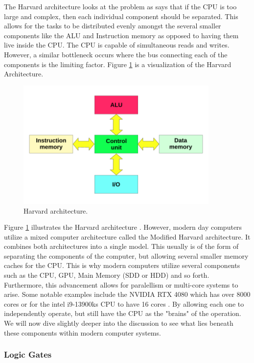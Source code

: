 The Harvard architecture looks at the problem as says that if the CPU is too large and complex, then each individual component should be separated.
This allows for the tasks to be distributed evenly amongst the several smaller components like the ALU and Instruction memory as opposed to having them live inside the CPU.
The CPU is capable of simultaneous reads and writes.
However, a similar bottleneck occurs where the bus connecting each of the components is the limiting factor.
Figure \ref{fig:HarvardArch} is a visualization of the Harvard Architecture.

\begin{figure}[htb]
    \centering
    \includegraphics[width=10cm]{Images/Harvard_architecture.svg.png}
       \caption{Harvard architecture.}
           \label{fig:HarvardArch}
\end{figure}

Figure \ref{fig:HarvardArch} illustrates the Harvard architecture \cite{HarvardArchImg}.
However, modern day computers utilize a mixed computer architecture called the Modified Harvard architecture.
It combines both architectures into a single model.
This usually is of the form of separating the components of the computer, but allowing several smaller memory caches for the CPU.
This is why modern computers utilize several components such as the CPU, GPU, Main Memory (SDD or HDD) and so forth.
Furthermore, this advancement allows for paralellism or multi-core systems to arise.
Some notable examples include the NVIDIA RTX 4080 which has over 8000 cores or for the intel i9-13900ks CPU to have 16 cores \cite{4080Specs,IntelSpecs}.
By allowing each one to independently operate, but still have the CPU as the "brains" of the operation.
We will now dive slightly deeper into the discussion to see what lies beneath these components within modern computer systems.

\subsubsection{Logic Gates}\label{subsec:LogicGates}

